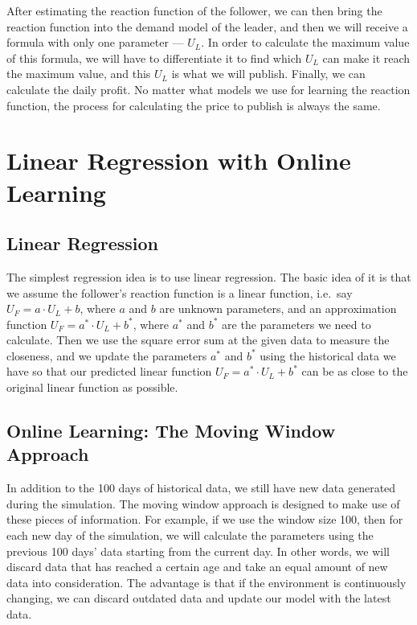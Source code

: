 \documentclass[a4paper]{article}
\begin{document}
After estimating the reaction function of the follower, we can then bring the
reaction function into the demand model of the leader, and then we will receive
a formula with only one parameter --- $U_L$.
In order to calculate the maximum value of this formula, we will have to
differentiate it to find which $U_L$ can make it reach the maximum value, and
this $U_L$ is what we will publish.
Finally, we can calculate the daily profit.
No matter what models we use for learning the reaction function, the process for
calculating the price to publish is always the same.

\section{Linear Regression with Online Learning}%
\label{sec:linearonlinelearning}
\subsection{Linear Regression}
The simplest regression idea is to use linear regression.
The basic idea of it is that we assume the follower's reaction function is a
linear function, i.e.\ say $U_F = a \cdot U_L + b$, where $a$ and $b$ are unknown
parameters, and an approximation function $U_F = a^* \cdot U_L+ b^*$, where $a^*$
and $b^*$ are the parameters we need to calculate.
Then we use the square error sum at the given data to measure the closeness,
and we update the parameters $a^*$ and $b^*$ using the historical data we have
so that our predicted linear function $U_F = a^* \cdot U_L+ b^*$ can be as close
to the original linear function as possible.

\subsection{Online Learning: The Moving Window Approach}
In addition to the 100 days of historical data, we still have new data generated
during the simulation.
The moving window approach is designed to make use of these pieces of
information.
For example, if we use the window size 100, then for each new day of the
simulation, we will calculate the parameters using the previous 100 days' data
starting from the current day.
In other words, we will discard data that has reached a certain age and take an
equal amount of new data into consideration.
The advantage is that if the environment is continuously changing, we can
discard outdated data and update our model with the latest data.
\end{document}
